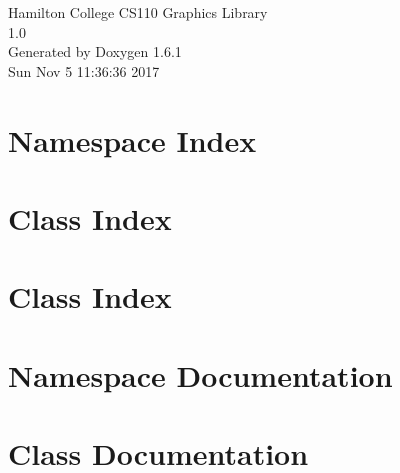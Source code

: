 \documentclass[a4paper]{book}
\begin{document}
\hypersetup{pageanchor=false}
\begin{titlepage}
\vspace*{7cm}
\begin{center}
{\Large Hamilton College CS110 Graphics Library \\[1ex]\large 1.0 }\\
\vspace*{1cm}
{\large Generated by Doxygen 1.6.1}\\
\vspace*{0.5cm}
{\small Sun Nov 5 11:36:36 2017}\\
\end{center}
\end{titlepage}
\clearemptydoublepage
{}
\tableofcontents
\clearemptydoublepage
{}
\hypersetup{pageanchor=true}
\chapter{Namespace Index}

\chapter{Class Index}

\chapter{Class Index}

\chapter{Namespace Documentation}

\chapter{Class Documentation}














\printindex
\end{document}
